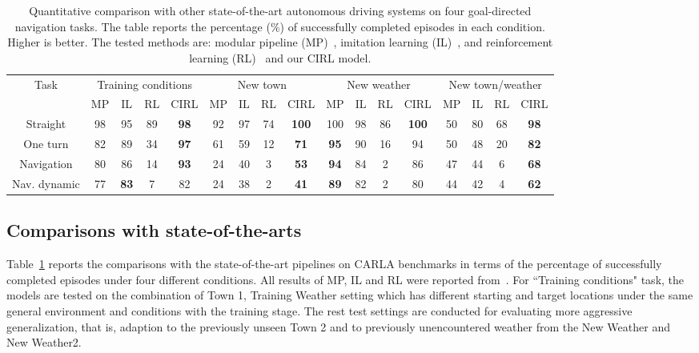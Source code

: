 \documentclass[runningheads]{llncs}
\begin{document}
 
\begin{table}[t]
\centering
\small
\caption{ Quantitative comparison with other state-of-the-art autonomous driving systems on four goal-directed navigation tasks. The table reports the percentage (\%) of successfully completed episodes in each condition. Higher
is better. The tested methods are: modular pipeline (MP)~\cite{dosovitskiy2017carla}, imitation learning (IL)~\cite{dosovitskiy2017carla}, and reinforcement
learning (RL)~\cite{dosovitskiy2017carla} and our CIRL model.}\vspace{-3mm}
\tabcolsep 0.015in 
\begin{tabular}{c|cccc|cccc|cccc|cccc|}
\toprule[0.1pt]
\multirow{2}{*}{Task}   & \multicolumn{4}{c}{Training conditions} & \multicolumn{4}{c}{New town} & \multicolumn{4}{c}{New weather} & \multicolumn{4}{c}{New town/weather} \\ & MP & IL & RL & CIRL & MP & IL & RL & CIRL & MP & IL & RL & CIRL & MP & IL & RL & CIRL\\ \hline                     
Straight & 98 & 95 & 89  & \textbf{98} &  92  & 97  & 74 & \textbf{100} & 100 & 98 & 86 & \textbf{100} & 50 & 80 & 68 & \textbf{98} \\
One turn & 82 & 89 & 34 & \textbf{97} & 61  & 59  & 12 & \textbf{71} & \textbf{95} & 90 & 16 & {94} & 50 & 48 & 20 & \textbf{82} \\   
Navigation & 80 & 86 & 14 & \textbf{93} & 24  & 40  & 3 & \textbf{53} & \textbf{94} & 84 & 2 & {86} & 47 & 44 & 6 & \textbf{68}\\
Nav. dynamic & 77 & \textbf{83} & 7 & {82} & 24  & 38 & 2 & \textbf{41} & \textbf{89} & 82 & 2 & {80} & 44 & 42 & 4 & \textbf{62}\\ 
\toprule[0.7pt]
\end{tabular}\vspace{-6mm}
\label{tab: results_origin}
\end{table}

\subsection{Comparisons with state-of-the-arts}
    
Table~\ref{tab: results_origin} reports the comparisons with the state-of-the-art pipelines on CARLA benchmarks in terms of the percentage of successfully completed episodes under four different conditions. All results of MP, IL and RL were reported from~\cite{dosovitskiy2017carla}. For ``Training conditions" task, the models are tested on the combination of Town 1, Training Weather setting which has different starting and target locations under the same general environment and conditions with the training stage. The rest test settings are conducted for evaluating more aggressive generalization, that is, adaption to the previously unseen Town 2 and to previously unencountered weather from the New Weather and New Weather2.
\end{document}
